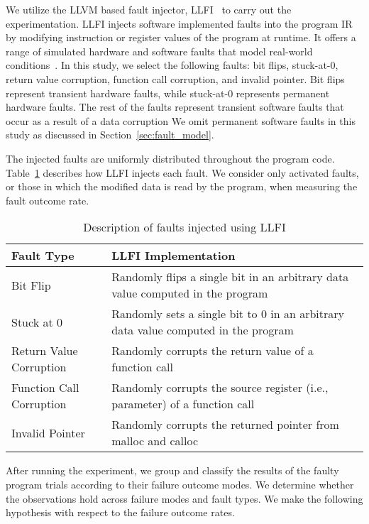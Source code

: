 We utilize the LLVM based fault injector, LLFI~\cite{LLFI} to carry out the experimentation.
LLFI injects software implemented faults into the program IR by modifying instruction or register values of the program at runtime.
It offers a range of simulated hardware and software faults that model real-world conditions~\cite{V2005}.
In this study, we select the following faults: bit flips, stuck-at-0, return value corruption, function call corruption, and invalid pointer.
Bit flips represent transient hardware faults, while stuck-at-0 represents permanent hardware faults. 
The rest of the faults represent transient software faults that occur as a result of a data corruption
We omit permanent software faults in this study as discussed in Section~\ref{sec:fault_model}.

The injected faults are uniformly distributed throughout the program code.
Table~\ref{tab:faulttypes} describes how LLFI injects each fault.
We consider only activated faults, or those in which the modified data is read by the program, when measuring the fault outcome rate.


\begin{table}[htbp]
\small{
\begin{center}
    \begin{tabular}{|p{3cm}|p{5cm}|}
    \hline
    \textbf{Fault Type} & \textbf{LLFI Implementation} \\ \hline
    Bit Flip & Randomly flips a single bit in an arbitrary data value computed in the program  \\ \hline
    Stuck at 0 & Randomly sets a single bit to 0 in an arbitrary data value computed in the program  \\ \hline
    Return Value Corruption & Randomly corrupts the return value of a function call \\ \hline
    Function Call Corruption & Randomly corrupts the source register (i.e., parameter) of a function call \\ \hline
    Invalid Pointer & Randomly corrupts the returned pointer from malloc and calloc\\ \hline
    \hline
    \end{tabular}
    \end{center}
    }
    \caption{Description of faults injected using LLFI}
    \label{tab:faulttypes}
\end{table}
 

After running the experiment, we group and classify the results of the faulty program trials according to their failure outcome modes.
We determine whether the observations hold across failure modes and fault types. 
We make the following hypothesis with respect to the failure outcome rates.

